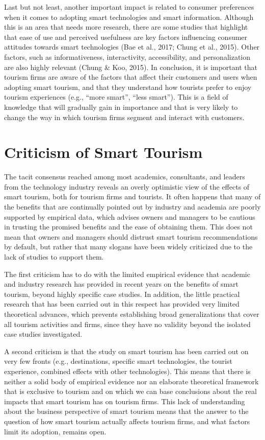 \documentclass[
  letterpaper,
  DIV=11,
  numbers=noendperiod]{scrreprt}
\begin{document}
Last but not least, another important impact is related to consumer
preferences when it comes to adopting smart technologies and smart
information. Although this is an area that needs more research, there
are some studies that highlight that ease of use and perceived
usefulness are key factors influencing consumer attitudes towards smart
technologies (Bae et al., 2017; Chung et al., 2015). Other factors, such
as informativeness, interactivity, accessibility, and personalization
are also highly relevant (Chung \& Koo, 2015). In conclusion, it is
important that tourism firms are aware of the factors that affect their
customers and users when adopting smart tourism, and that they
understand how tourists prefer to enjoy tourism experiences (e.g.,
``more smart'', ``less smart''). This is a field of knowledge that will
gradually gain in importance and that is very likely to change the way
in which tourism firms segment and interact with customers.

\hypertarget{criticism-of-smart-tourism}{%
\section{Criticism of Smart Tourism}\label{criticism-of-smart-tourism}}

The tacit consensus reached among most academics, consultants, and
leaders from the technology industry reveals an overly optimistic view
of the effects of smart tourism, both for tourism firms and tourists. It
often happens that many of the benefits that are continually pointed out
by industry and academia are poorly supported by empirical data, which
advises owners and managers to be cautious in trusting the promised
benefits and the ease of obtaining them. This does not mean that owners
and managers should distrust smart tourism recommendations by default,
but rather that many slogans have been widely criticized due to the lack
of studies to support them.

The first criticism has to do with the limited empirical evidence that
academic and industry research has provided in recent years on the
benefits of smart tourism, beyond highly specific case studies. In
addition, the little practical research that has been carried out in
this respect has provided very limited theoretical advances, which
prevents establishing broad generalizations that cover all tourism
activities and firms, since they have no validity beyond the isolated
case studies investigated.

A second criticism is that the study on smart tourism has been carried
out on very few fronts (e.g., destinations, specific smart technologies,
the tourist experience, combined effects with other technologies). This
means that there is neither a solid body of empirical evidence nor an
elaborate theoretical framework that is exclusive to tourism and on
which we can base conclusions about the real impacts that smart tourism
has on tourism firms. This lack of understanding about the business
perspective of smart tourism means that the answer to the question of
how smart tourism actually affects tourism firms, and what factors limit
its adoption, remains open.
\end{document}
